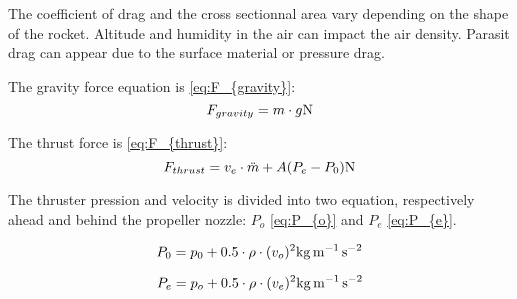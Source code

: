 		The coefficient of drag and the cross sectionnal area vary depending on the shape of the rocket. Altitude and humidity in the air can impact the air density. Parasit drag can appear due to the surface material or pressure drag.
		
		The gravity force equation is \eqref{eq:F_{gravity}}:
		\begin{equation}
		F_{gravity} = m \cdot g \si{\newton} \label{eq:F_{gravity}}
		\end{equation}
		\startexplain
		\stopexplain
			
		
		The thrust force is \eqref{eq:F_{thrust}}:
		\begin{equation}
		F_{thrust} = v_{e} \cdot \ddot{m} + A (P_{e} -P_{0}) \si{\newton} \label{eq:F_{thrust}}
		\end{equation}
		\startexplain
		\stopexplain
		
		
		The thruster pression and velocity is divided into two equation, respectively ahead and behind the propeller nozzle: $P_{o}$ \eqref{eq:P_{o}} and $P_{e}$ \eqref{eq:P_{e}}.
		
		\begin{equation}
		P_{0} = p_{0} + 0.5 \cdot \rho \cdot(v_{o})^2 \si{\kilo\gram\per\meter\per\second\squared} \label{eq:P_{o}}
		\end{equation}
		\startexplain
		\stopexplain
		
		\begin{equation}
		P_{e} = p_{o} + 0.5 \cdot \rho \cdot(v_{e})^2 \si{\kilo\gram\per\meter\per\second\squared} \label{eq:P_{e}}
		\end{equation}
		\startexplain
		\stopexplain
		
